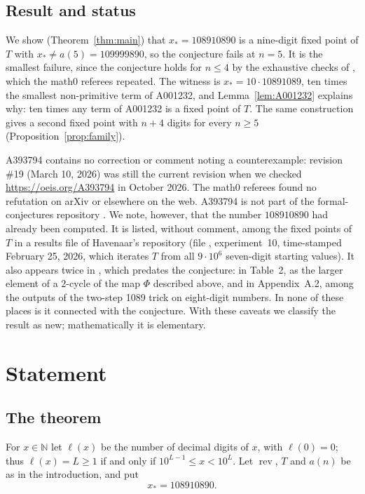 \documentclass[11pt]{amsart}
\theoremstyle{plain}
\theoremstyle{definition}
\newcommand{\N}{\mathbb{N}}
\DeclareMathOperator{\rev}{rev}
\newcommand{\len}{\ell}
\newcommand{\xs}{x_{\ast}}
\begin{document}
\subsection*{Result and status}
We show (Theorem~\ref{thm:main}) that $\xs=108910890$ is a nine-digit fixed point of $T$ with $\xs\ne a(5)=109999890$, so the conjecture fails at $n=5$. It is the smallest failure, since the conjecture holds for $n\le4$ by the exhaustive checks of \cite{A393794}, which the math0 referees repeated. The witness is $\xs=10\cdot 10891089$, ten times the smallest non-primitive term of A001232, and Lemma~\ref{lem:A001232} explains why: ten times any term of A001232 is a fixed point of $T$. The same construction gives a second fixed point with $n+4$ digits for every $n\ge5$ (Proposition~\ref{prop:family}).

A393794 contains no correction or comment noting a counterexample: revision \#19 (March 10, 2026) was still the current revision when we checked \url{https://oeis.org/A393794} in October 2026. The math0 referees found no refutation on arXiv or elsewhere on the web. A393794 is not part of the formal-conjectures repository \cite{FC}.
We note, however, that the number $108910890$ had already been computed. It is listed, without comment, among the fixed points of $T$ in a results file of Havenaar's repository \cite{HavenaarRepo} (file , experiment~10, time-stamped February 25, 2026, which iterates $T$ from all $9\cdot10^6$ seven-digit starting values). It also appears twice in \cite{AL2}, which predates the conjecture: in Table~2, as the larger element of a $2$-cycle of the map $\Phi$ described above, and in Appendix~A.2, among the outputs of the two-step 1089 trick on eight-digit numbers. In none of these places is it connected with the conjecture. With these caveats we classify the result as new; mathematically it is elementary.

\section{Statement}\label{sec:statement}

\subsection{The theorem}
For $x\in\N$ let $\len(x)$ be the number of decimal digits of $x$, with $\len(0)=0$; thus $\len(x)=L\ge1$ if and only if $10^{L-1}\le x<10^{L}$. Let $\rev$, $T$ and $a(n)$ be as in the introduction, and put
\[
  \xs=108910890 .
\]
\end{document}
